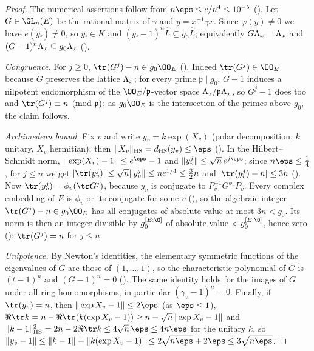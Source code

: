 \begin{proof}
The numerical assertions follow from $n\eps\le c/n^4\le10^{-5}$ ().
Let $G\in\GL_n(E)$ be the rational matrix of $\gamma$ and $y=x^{-1}\gamma x$. Since $\varphi(y)\ne0$ we have $e(y_{\mathrm f})\ne0$,
so $y_{\mathrm f}\in K$ and $(y_{\mathrm f}-1)^n\hat L\subseteq g_0\hat L$; equivalently $G\Lambda_x=\Lambda_x$ and
$(G-1)^n\Lambda_x\subseteq g_0\Lambda_x$ ().

\emph{Congruence.} For $j\ge0$, $\tr(G^j)-n\in g_0\OO_E$ (). Indeed
$\tr(G^j)\in\OO_E$ because $G$ preserves the lattice $\Lambda_x$; for every prime $\mathfrak p\mid g_0$, $G-1$ induces a
nilpotent endomorphism of the $\OO_E/\mathfrak p$-vector space $\Lambda_x/\mathfrak p\Lambda_x$, so $G^j-1$ does too and
$\tr(G^j)\equiv n\pmod{\mathfrak p}$; as $g_0\OO_E$ is the intersection of the primes above $g_0$, the claim follows.

\emph{Archimedean bound.} Fix $v$ and write $y_v=k\exp(X_v)$ (polar decomposition, $k$ unitary, $X_v$ hermitian); then
$\|X_v\|_{\mathrm{HS}}=\rowsdHS(y_v)\le\eps$ (). In the Hilbert--Schmidt
norm, $\|\exp(X_v)-1\|\le e^{\eps}-1$ and $\|y_v^j\|\le\sqrt n\,e^{j\eps}$; since $n\eps\le\frac14$, for $j\le n$ we get
$|\tr(y_v^j)|\le\sqrt n\|y_v^j\|\le ne^{1/4}\le\frac32n$ and $|\tr(y_v^j)-n|\le3n$
(). Now
$\tr(y_v^j)=\phi_v(\tr G^j)$, because $y_v$ is conjugate to $P_v^{-1}G^{\phi_v}P_v$. Every complex embedding of $E$ is
$\phi_v$ or its conjugate for some $v$ (), so the algebraic
integer $\tr(G^j)-n\in g_0\OO_E$ has all conjugates of absolute value at most $3n<g_0$. Its norm is then an integer
divisible by $g_0^{[E:\Q]}$ of absolute value $<g_0^{[E:\Q]}$, hence zero
(): $\tr(G^j)=n$ for $j\le n$.

\emph{Unipotence.} By Newton's identities, the elementary symmetric functions of the eigenvalues of $G$ are those of
$(1,\dots,1)$, so the characteristic polynomial of $G$ is $(t-1)^n$ and $(G-1)^n=0$
(). The same identity holds for the images of $G$ under all ring
homomorphisms, in particular $(\gamma_v-1)^n=0$. Finally, if $\tr(y_v)=n$, then $\|\exp X_v-1\|\le2\eps$ (as $\eps\le1$),
$\Re\tr k=n-\Re\tr(k(\exp X_v-1))\ge n-\sqrt n\|\exp X_v-1\|$ and $\|k-1\|_{\mathrm{HS}}^2=2n-2\Re\tr k\le4\sqrt n\,\eps\le4n\eps$
for the unitary $k$, so $\|y_v-1\|\le\|k-1\|+\|k(\exp X_v-1)\|\le2\sqrt{n\eps}+2\eps\le3\sqrt{n\eps}$.
\end{proof}


